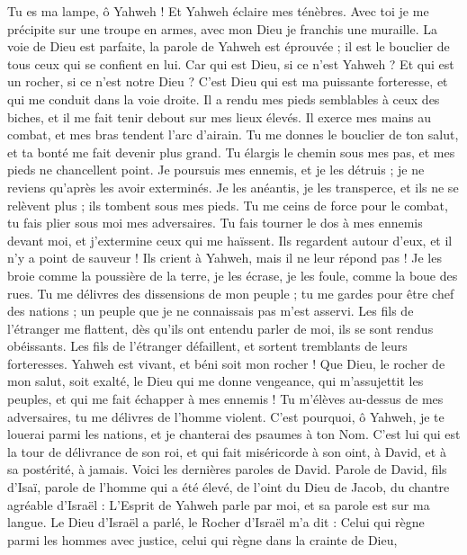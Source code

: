 \begin{multicols}{2}
Tu es ma lampe, ô Yahweh ! Et Yahweh éclaire mes ténèbres.
Avec toi je me précipite sur une troupe en armes, avec mon Dieu je franchis une muraille.
La voie de Dieu est parfaite, la parole de Yahweh est éprouvée ; il est le bouclier de tous ceux qui se confient en lui.
Car qui est Dieu, si ce n'est Yahweh ? Et qui est un rocher, si ce n'est notre Dieu ?
C'est Dieu qui est ma puissante forteresse, et qui me conduit dans la voie droite.
Il a rendu mes pieds semblables à ceux des biches, et il me fait tenir debout sur mes lieux élevés.
Il exerce mes mains au combat, et mes bras tendent l'arc d'airain.
Tu me donnes le bouclier de ton salut, et ta bonté me fait devenir plus grand.
Tu élargis le chemin sous mes pas, et mes pieds ne chancellent point.
Je poursuis mes ennemis, et je les détruis ; je ne reviens qu'après les avoir exterminés.
Je les anéantis, je les transperce, et ils ne se relèvent plus ; ils tombent sous mes pieds.
Tu me ceins de force pour le combat, tu fais plier sous moi mes adversaires.
Tu fais tourner le dos à mes ennemis devant moi, et j'extermine ceux qui me haïssent.
Ils regardent autour d’eux, et il n’y a point de sauveur ! Ils crient à Yahweh, mais il ne leur répond pas !
Je les broie comme la poussière de la terre, je les écrase, je les foule, comme la boue des rues.
Tu me délivres des dissensions de mon peuple ; tu me gardes pour être chef des nations ; un peuple que je ne connaissais pas m'est asservi.
Les fils de l'étranger me flattent, dès qu’ils ont entendu parler de moi, ils se sont rendus obéissants.
Les fils de l'étranger défaillent, et sortent tremblants de leurs forteresses.
Yahweh est vivant, et béni soit mon rocher ! Que Dieu, le rocher de mon salut, soit exalté,
le Dieu qui me donne vengeance, qui m'assujettit les peuples,
et qui me fait échapper à mes ennemis ! Tu m'élèves au-dessus de mes adversaires, tu me délivres de l'homme violent.
C'est pourquoi, ô Yahweh, je te louerai parmi les nations, et je chanterai des psaumes à ton Nom.
C'est lui qui est la tour de délivrance de son roi, et qui fait miséricorde à son oint, à David, et à sa postérité, à jamais.
\VerseOne{}Voici les dernières paroles de David. Parole de David, fils d'Isaï, parole de l'homme qui a été élevé, de l'oint du Dieu de Jacob, du chantre agréable d'Israël :
L'Esprit de Yahweh parle par moi, et sa parole est sur ma langue.
Le Dieu d'Israël a parlé, le Rocher d'Israël m'a dit : Celui qui règne parmi les hommes avec justice, celui qui règne dans la crainte de Dieu,

\end{multicols}
